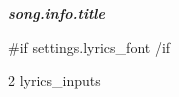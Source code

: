 \documentclass{article}
\begin{document}
\begin{center}
{
    \Fontskrivan\bfseries\slshape
    \fontsize{40pt}{35pt}\selectfont
    \color{blue}
    {{{song.info.title}}}
} \\[0.5em]
{
}
\end{center}
\vspace{1em}

{{#if settings.lyrics_font}}
{{/if}}
\setlength{\columnseprule}{0.4pt}
\begin{multicols}{2}
{{{lyrics_inputs}}}
\end{multicols}
\end{document}
